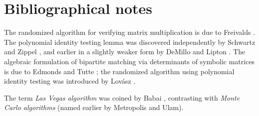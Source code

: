 \section{Bibliographical notes}

The randomized algorithm for verifying matrix multiplication is due to
Freivalds \cite{f-pmcul-77}.  The polynomial identity testing lemma was
discovered independently by Schwartz \cite{s-fpavp-80} and Zippel
\cite{z-pasp-79}, and earlier in a slightly weaker form by DeMillo and
Lipton \cite{dl-prapt-78}.  The algebraic formulation of bipartite
matching via determinants of symbolic matrices is due to Edmonds
\cite{e-sdra-67} and Tutte \cite{t-flg-47}; the randomized algorithm
using polynomial identity testing was introduced by Lov{\'a}sz
\cite{l-odmra-79}.

The term \emph{Las Vegas algorithm} was coined by Babai \cite{b-mcmgi-79},
contrasting with \emph{Monte Carlo algorithms} (named earlier by
Metropolis and Ulam).


\ChapterEnd{}
